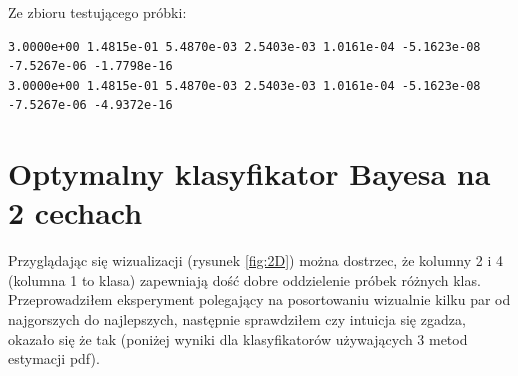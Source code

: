 \documentclass[a4paper]{article}
\begin{document}
Ze zbioru testującego próbki:
\begin{verbatim}
3.0000e+00 1.4815e-01 5.4870e-03 2.5403e-03 1.0161e-04 -5.1623e-08 -7.5267e-06 -1.7798e-16
3.0000e+00 1.4815e-01 5.4870e-03 2.5403e-03 1.0161e-04 -5.1623e-08 -7.5267e-06 -4.9372e-16
\end{verbatim}





\section{Optymalny klasyfikator Bayesa na 2 cechach}
Przyglądając się wizualizacji (rysunek \ref{fig:2D}) można dostrzec,
że kolumny 2 i 4 (kolumna 1 to klasa) zapewniają dość dobre oddzielenie próbek różnych klas.
Przeprowadziłem eksperyment polegający na posortowaniu wizualnie kilku par od najgorszych do najlepszych,
następnie sprawdziłem czy intuicja się zgadza, okazało się że tak
(poniżej wyniki dla klasyfikatorów używających 3 metod estymacji pdf).
\end{document}
